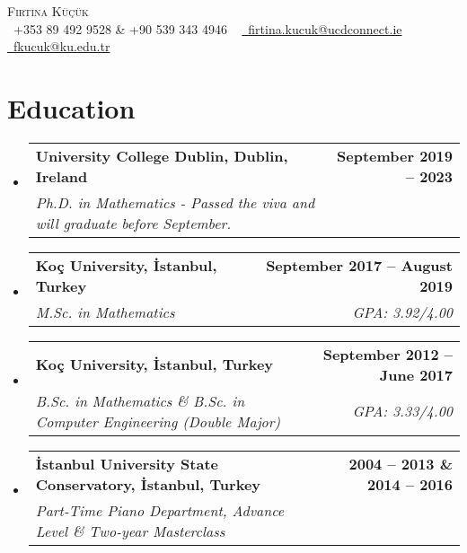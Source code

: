 \documentclass[letterpaper,11pt]{article}
\makeatletter
\newcommand{\resumeSubheading}[4]{
  \vspace{-2pt}\item
    \begin{tabular*}{1.0\textwidth}[t]{l@{\extracolsep{\fill}}r}
      \textbf{#1} & \textbf{\small #2} \\
      \textit{\small#3} & \textit{\small #4} \\
    \end{tabular*}\vspace{-7pt}
}
\newcommand{\resumeSubHeadingListStart}{\begin{itemize}[leftmargin=0.0in, label={}]}
\newcommand{\resumeSubHeadingListEnd}{\end{itemize}}
\makeatother
\begin{document}
\begin{center}
    {\Huge \scshape Fırtına Küçük} \\ \vspace{1pt}
    \small
    \raisebox{-0.1\height}\faPhone\ +353 89 492 9528 \& +90 539 343 4946 ~
    \href{mailto:firtina.kucuk@ucdconnect.ie}{\faEnvelope\ firtina.kucuk@ucdconnect.ie} ~ 
    \href{mailto:fkucuk@ku.edu.tr}{\faEnvelope\ fkucuk@ku.edu.tr} ~ 
    \vspace{-8pt}
\end{center}




\section{Education}
  \resumeSubHeadingListStart
    \resumeSubheading
      {University College Dublin, Dublin, Ireland }{September 2019 -- 2023}
      {Ph.D. in Mathematics - Passed the viva and will graduate before September.}{}
      
      
    \resumeSubheading
      {Koç University, İstanbul, Turkey}{September 2017 -- August 2019}
      {M.Sc. in Mathematics}{GPA: 3.92/4.00}
      

      \resumeSubheading
      {Koç University, İstanbul, Turkey}{September 2012 -- June 2017}
      {B.Sc. in Mathematics \& B.Sc. in Computer Engineering (Double Major)}{GPA: 3.33/4.00}

      \resumeSubheading
      {İstanbul University State Conservatory, İstanbul, Turkey}{2004 -- 2013 \& 2014 -- 2016}
      {Part-Time Piano Department, Advance Level \& Two-year Masterclass}{}

      
  \resumeSubHeadingListEnd
\vspace{-18pt}
\end{document}
